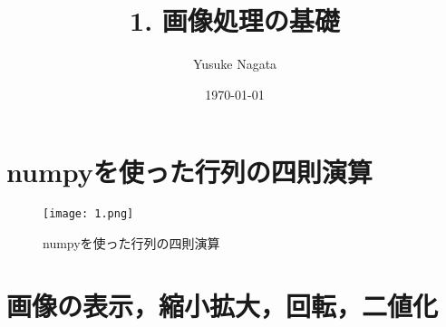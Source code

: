 \documentclass[a4paper,11pt]{jsarticle}
\begin{document}
\title{1. 画像処理の基礎}
\author{Yusuke Nagata}
\date{\today}
\maketitle

\section{numpyを使った行列の四則演算}
\begin{figure}[h]
  \centering
  \texttt{[image: 1.png]}
  \caption{numpyを使った行列の四則演算}
\end{figure}
\section{画像の表示，縮小拡大，回転，二値化}
\end{document}

